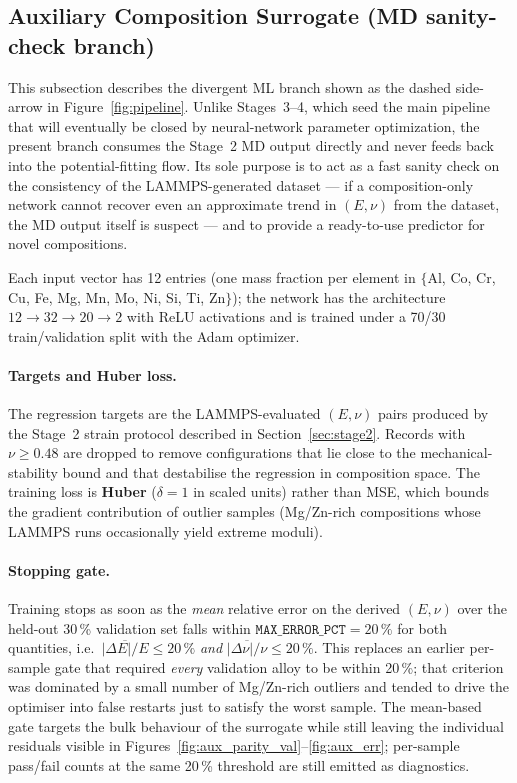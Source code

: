 \subsection{Auxiliary Composition Surrogate (MD sanity-check branch)}
\label{sec:comp_nn}

This subsection describes the divergent ML branch shown as the dashed
side-arrow in Figure~\ref{fig:pipeline}. Unlike Stages~3--4, which seed
the main pipeline that will eventually be closed by neural-network
parameter optimization, the present branch consumes the Stage~2 MD
output directly and never feeds back into the potential-fitting flow.
Its sole purpose is to act as a fast sanity check on the consistency
of the LAMMPS-generated dataset --- if a composition-only network
cannot recover even an approximate trend in $(E,\nu)$ from the
dataset, the MD output itself is suspect --- and to provide a
ready-to-use predictor for novel compositions.

Each input vector has 12 entries (one mass fraction per element in
$\{$Al, Co, Cr, Cu, Fe, Mg, Mn, Mo, Ni, Si, Ti, Zn$\}$); the network has the
architecture $12\to32\to20\to2$ with ReLU activations and is trained
under a 70/30 train/validation split with the Adam optimizer.

\paragraph{Targets and Huber loss.}
The regression targets are the LAMMPS-evaluated $(E,\nu)$ pairs
produced by the Stage~2 strain protocol described in
Section~\ref{sec:stage2}. Records with $\nu\!\geq\!0.48$ are dropped to
remove configurations that lie close to the mechanical-stability bound
and that destabilise the regression in composition space. The training
loss is \textbf{Huber} ($\delta=1$ in scaled units) rather than MSE,
which bounds the gradient contribution of outlier samples (Mg/Zn-rich
compositions whose LAMMPS runs occasionally yield extreme moduli).

\paragraph{Stopping gate.}
Training stops as soon as the \emph{mean} relative error on the
derived $(E,\nu)$ over the held-out 30\,\% validation set falls within
$\mathtt{MAX\_ERROR\_PCT}=20\,\%$ for both quantities, i.e.\
$\overline{|\Delta E|/E}\le 20\,\%$ \emph{and}
$\overline{|\Delta \nu|/\nu}\le 20\,\%$. This replaces an earlier
per-sample gate that required \emph{every} validation alloy to be
within 20\,\%; that criterion was dominated by a small number of
Mg/Zn-rich outliers and tended to drive the optimiser into false
restarts just to satisfy the worst sample. The mean-based gate
targets the bulk behaviour of the surrogate while still leaving the
individual residuals visible in
Figures~\ref{fig:aux_parity_val}--\ref{fig:aux_err}; per-sample
pass/fail counts at the same 20\,\% threshold are still emitted as
diagnostics.

